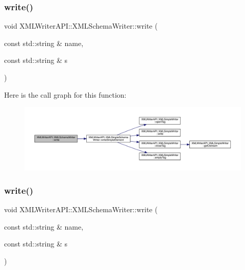 \subsubsection{\texorpdfstring{write()}{write()}\hspace{0.1cm}{\footnotesize\ttfamily [2/15]}}
{\footnotesize\ttfamily void X\+M\+L\+Writer\+A\+P\+I\+::\+X\+M\+L\+Schema\+Writer\+::write (\begin{DoxyParamCaption}\item[{const std\+::string \&}]{name,  }\item[{const std\+::string \&}]{s }\end{DoxyParamCaption})\hspace{0.3cm}{\ttfamily [inline]}}

Here is the call graph for this function\+:
\nopagebreak
\begin{figure}[H]
\begin{center}
\leavevmode
\includegraphics[width=350pt]{db/d34/classXMLWriterAPI_1_1XMLSchemaWriter_a1922edfcbb9d52c70949fd8c8dd97569_cgraph}
\end{center}
\end{figure}
\mbox{\label{classXMLWriterAPI_1_1XMLSchemaWriter_a1922edfcbb9d52c70949fd8c8dd97569}} 
\subsubsection{\texorpdfstring{write()}{write()}\hspace{0.1cm}{\footnotesize\ttfamily [3/15]}}
{\footnotesize\ttfamily void X\+M\+L\+Writer\+A\+P\+I\+::\+X\+M\+L\+Schema\+Writer\+::write (\begin{DoxyParamCaption}\item[{const std\+::string \&}]{name,  }\item[{const std\+::string \&}]{s }\end{DoxyParamCaption})\hspace{0.3cm}{\ttfamily [inline]}}

